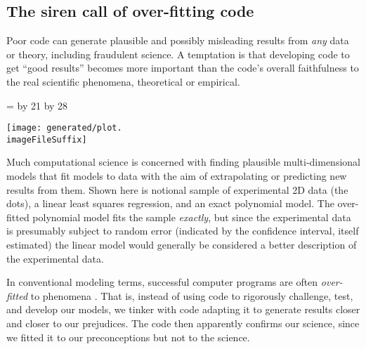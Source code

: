 \subsection{The siren call of over-fitting code}\label{over-fit}
Poor code can generate plausible and possibly misleading results from \emph{any\/} data or theory, including fraudulent science. A temptation is that developing code to get ``good results'' becomes more important than the code's overall faithfulness to the real scientific phenomena, theoretical or empirical. 
\def\imageWidthCalculation{\multiply \imageWidth by 21 \divide \imageWidth by 28}
\def\figureStarDetails{*}

\def\imageWidthCalculation{\multiply \imageWidth by 21 \divide \imageWidth by 28}
\def\figureStarDetails{*}

\begin{figure\figureStarDetails}[t]
{ \newdimen \imageWidth 
  \imageWidth=\textwidth
  \imageWidthCalculation
  \begin{center}%
\texttt{[image: generated/plot.\\imageFileSuffix]}
\end{center}}
\caption{Much computational science is concerned with finding plausible multi-dimensional models that fit models to data with the aim of extrapolating or predicting new results from them. Shown here is notional sample of experimental 2D data (the dots), a linear least squares regression, and an exact polynomial model. The over-fitted polynomial model fits the sample \emph{exactly\/}, but since the experimental data is presumably subject to random error (indicated by the confidence interval, itself estimated) the linear model would generally be considered a better description of the experimental data.}
\label{fig-overfit}
\end{figure\figureStarDetails}

In conventional modeling terms, successful computer programs are often \emph{over-fitted\/} to phenomena \cite{over-fit}. That is, instead of using code to rigorously challenge, test, and develop our models, we tinker with code adapting it to generate results closer and closer to our prejudices. The code then apparently confirms our science, since we fitted it to our preconceptions but not to the science.  

